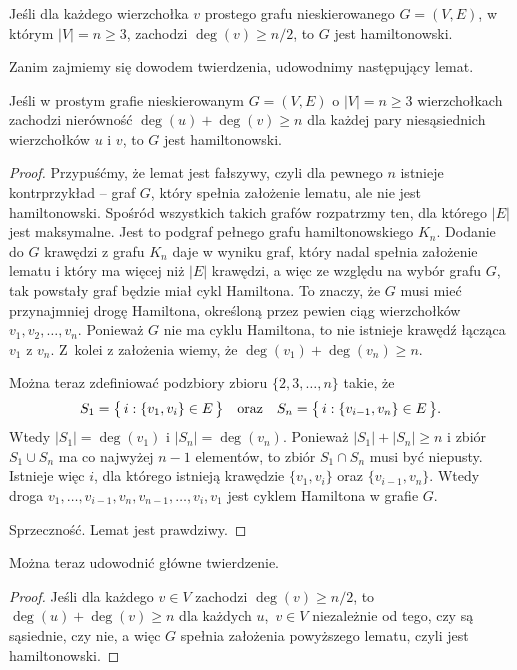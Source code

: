 \subsubsection{} %
\begin{twierdzenie*}[Dirac]
	Jeśli dla każdego wierzchołka $v$ prostego grafu nieskierowanego $G=(V,E)$, w którym $|V|=n\ge3$, zachodzi $\deg(v)\ge n/2$, to $G$ jest hamiltonowski.
\end{twierdzenie*}
Zanim zajmiemy się dowodem twierdzenia, udowodnimy następujący lemat.
\begin{lemat*}[Ore]
	Jeśli w prostym grafie nieskierowanym $G=(V,E)$ o $|V|=n\ge3$ wierzchołkach zachodzi nierówność $\deg(u)+\deg(v)\ge n$ dla każdej pary niesąsiednich wierzchołków $u$ i $v$, to $G$ jest hamiltonowski.
\end{lemat*}
\begin{proof}
Przypuśćmy, że lemat jest fałszywy, czyli dla pewnego $n$ istnieje kontrprzykład -- graf $G$, który spełnia założenie lematu, ale nie jest hamiltonowski. Spośród wszystkich takich grafów rozpatrzmy ten, dla którego $|E|$ jest maksymalne. Jest to podgraf pełnego grafu hamiltonowskiego $K_n$. Dodanie do $G$ krawędzi z grafu $K_n$ daje w wyniku graf, który nadal spełnia założenie lematu i który ma więcej niż $|E|$ krawędzi, a więc ze względu na wybór grafu $G$, tak powstały graf będzie miał cykl Hamiltona. To znaczy, że $G$ musi mieć przynajmniej drogę Hamiltona, określoną przez pewien ciąg wierzchołków $v_1,v_2,\dots,v_n$. Ponieważ $G$ nie ma cyklu Hamiltona, to nie istnieje krawędź łącząca $v_1$ z $v_n$. Z~kolei z założenia wiemy, że $\deg(v_1)+\deg(v_n)\ge n$.

Można teraz zdefiniować podzbiory zbioru $\{2,3,\dots,n\}$ takie, że
\[
	S_1 = \bigl\{\,i:\{v_1,v_i\}\in E\,\bigr\}\quad\hbox{oraz}\quad S_n = \bigl\{\,i:\{v_{i-1},v_n\}\in E\,\bigr\}.
\]
Wtedy $|S_1|=\deg(v_1)$ i $|S_n|=\deg(v_n)$. Ponieważ $|S_1|+|S_n|\ge n$ i zbiór $S_1\cup S_n$ ma co najwyżej $n-1$ elementów, to zbiór $S_1\cap S_n$ musi być niepusty. Istnieje więc $i$, dla którego istnieją krawędzie $\{v_1,v_i\}$ oraz $\{v_{i-1},v_n\}$. Wtedy droga $v_1,\dots,v_{i-1},v_n,v_{n-1},\dots,v_i,v_1$ jest cyklem Hamiltona w grafie $G$.

Sprzeczność. Lemat jest prawdziwy.
\end{proof}

Można teraz udowodnić główne twierdzenie.
\begin{proof}
Jeśli dla każdego $v\in V$ zachodzi $\deg(v)\ge n/2$, to $\deg(u)+\deg(v)\ge n$ dla każdych $u$,~$v\in V$ niezależnie od tego, czy są sąsiednie, czy nie, a więc $G$ spełnia założenia powyższego lematu, czyli jest hamiltonowski.
\end{proof}

